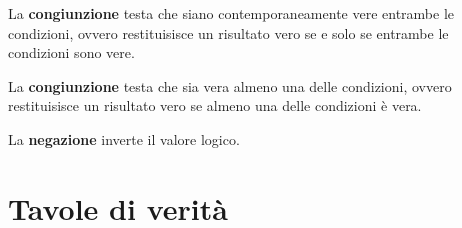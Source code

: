 \documentclass[
  a4paper,
  DIV=11,
  numbers=noendperiod]{scrreprt}
\begin{document}
\begin{table}

\caption{\label{tbl-operatori-logici}Operatori logici in R (con x = 30)}


\end{table}%

La \textbf{congiunzione} testa che siano contemporaneamente vere
entrambe le condizioni, ovvero restituisisce un risultato vero se e solo
se entrambe le condizioni sono vere.

La \textbf{congiunzione} testa che sia vera almeno una delle condizioni,
ovvero restituisisce un risultato vero se almeno una delle condizioni è
vera.

La \textbf{negazione} inverte il valore logico.

\section{Tavole di verità}\label{tavole-di-verituxe0}
\end{document}
